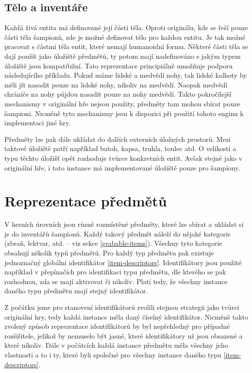 \subsection{Tělo a inventáře}
Každá živá entita má definované její části těla. Oproti originálu, kde se řeší pouze části těla šampionů,
zde je možné definovat tělo pro každou entitu. Je tak možné pracovat s částmi těla entit, které nemají humanoidní formu.
Některé části těla se dají použít jako úložiště předmětů, ty potom mají nadefinováno s jakým typem úložiště jsou kompatibilní.
Tato reprezentace principiálně umožňuje podporu následujícího příkladu. Pokud máme lidské a medvědí nohy, tak lidské
kalhoty by měli jít nasadit pouze na lidské nohy, nikoliv na medvědí. Naopak medvědí chrániče na nohy půjdou nasadit pouze na
nohy medvědí. Takto pokročilejší mechanismy v originální hře nejsou použity, předměty tam mohou sbírat pouze šampioni. Nicméně
tyto mechanismy jsou k dispozici při použití tohoto enginu k implementaci jiné hry.

Předměty lze pak dále ukládat do dalších externích úložných prostorů. 
Mezi taktové úložiště patří například batoh, kapsa, truhla, toulec atd.
O velikosti a typu těchto úložišť opět rozhoduje tvůrce konkretních 
entit. Avšak stejně jako v originální hře, i tato instance má implementované 
úložiště pouze pro šampiony.

\section{Reprezentace předmětů}\label{item-factories}

V herních úrovních jsou různě rozmístěné předměty, které lze sbírat a ukládat si je do inventářů šampionů.
Každý takový předmět náleží do nějaké kategorie (zbraň, lektvar, atd. -- viz sekce \ref{grabable-items}). Všechny 
tyto kategorie obsahují několik typů předmětů. Pro každý typ předmětu pak existuje jednoznačný globální identifikátor \vref{item-descriptors}.
Identifikátory jsou použité například v přepínačích pro identifikaci typu předmětu, dle kterého se pak rozhodnou, 
zda se mají aktivovat či nikoliv. Platí tedy, že všechny instance daného typu předmětu mají stejný identifikátor.

Z počátku jsme pro stanovení identifikátorů zvolili stejnou strategii jako tvůrci originální hry, tedy každá
instance měla daný číselný identifikátor.
Nicméně takto zvolený způsob reprezentace identifikátorů by byl nepřehledný pro případné rozšiřitele, jelikož
by nemuselo být jasné, které identifikátory už jsou obsazené a které nikoliv. Dále v počátcích každá instance
předmětu měla všechny jeho vlastnosti a to i ty, které byli společné pro všechny instance daného typu \vref{item-descriptors}.

